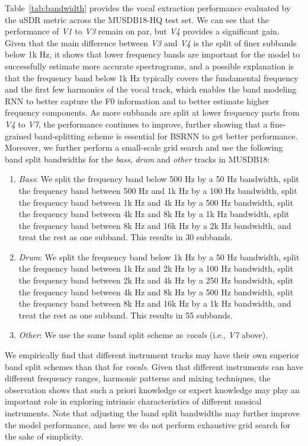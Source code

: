 Table~\ref{tab:bandwidth} provides the vocal extraction performance evaluated by the uSDR metric across the MUSDB18-HQ test set. We can see that the performance of \textit{V1} to \textit{V3} remain on par, but \textit{V4} provides a significant gain. Given that the main difference between \textit{V3} and \textit{V4} is the split of finer subbands below 1k Hz, it shows that lower frequency bands are important for the model to successfully estimate more accurate spectrograms, and a possible explanation is that the frequency band below 1k Hz typically covers the fundamental frequency and the first few harmonics of the vocal track, which enables the band modeling RNN to better capture the F0 information and to better estimate higher frequency components. As more subbands are split at lower frequency parts from \textit{V4} to \textit{V7}, the performance continues to improve, further showing that a fine-grained band-splitting scheme is essential for BSRNN to get better performance. Moreover, we further perform a small-scale grid search and use the following band split bandwidths for the \textit{bass}, \textit{drum} and \textit{other} tracks in MUSDB18:
\begin{enumerate}
    \item \textit{Bass}: We split the frequency band below 500 Hz by a 50 Hz bandwidth, split the frequency band between 500 Hz and 1k Hz by a 100 Hz bandwidth, split the frequency band between 1k Hz and 4k Hz by a 500 Hz bandwidth, split the frequency band between 4k Hz and 8k Hz by a 1k Hz bandwidth, split the frequency band between 8k Hz and 16k Hz by a 2k Hz bandwidth, and treat the rest as one subband. This results in 30 subbands.
    \item \textit{Drum}: We split the frequency band below 1k Hz by a 50 Hz bandwidth, split the frequency band between 1k Hz and 2k Hz by a 100 Hz bandwidth, split the frequency band between 2k Hz and 4k Hz by a 250 Hz bandwidth, split the frequency band between 4k Hz and 8k Hz by a 500 Hz bandwidth, split the frequency band between 8k Hz and 16k Hz by a 1k Hz bandwidth, and treat the rest as one subband. This results in 55 subbands.
    \item \textit{Other}: We use the same band split scheme as \textit{vocals} (i.e., \textit{V7} above).
\end{enumerate}

We empirically find that different instrument tracks may have their own superior band split schemes than that for \textit{vocals}. Given that different instruments can have different frequency ranges, harmonic patterns and mixing techniques, the observation shows that such a priori knowledge or expert knowledge may play an important role in exploring intrinsic characteristics of different musical instruments. Note that adjusting the band split bandwidths may further improve the model performance, and here we do not perform exhaustive grid search for the sake of simplicity.

